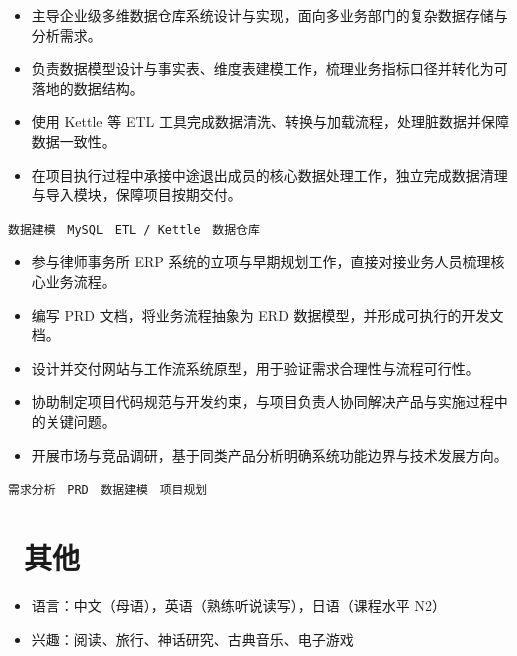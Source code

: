 \documentclass{resume}
\begin{document}

\begin{itemize}
  \item 主导企业级多维数据仓库系统设计与实现，面向多业务部门的复杂数据存储与分析需求。
  \item 负责数据模型设计与事实表、维度表建模工作，梳理业务指标口径并转化为可落地的数据结构。
  \item 使用 Kettle 等 ETL 工具完成数据清洗、转换与加载流程，处理脏数据并保障数据一致性。
  \item 在项目执行过程中承接中途退出成员的核心数据处理工作，独立完成数据清理与导入模块，保障项目按期交付。
\end{itemize}

\vspace{0.3em}
\texttt{数据建模} \textperiodcentered\
\texttt{MySQL} \textperiodcentered\
\texttt{ETL / Kettle} \textperiodcentered\
\texttt{数据仓库}



\begin{itemize}
  \item 参与律师事务所 ERP 系统的立项与早期规划工作，直接对接业务人员梳理核心业务流程。
  \item 编写 PRD 文档，将业务流程抽象为 ERD 数据模型，并形成可执行的开发文档。
  \item 设计并交付网站与工作流系统原型，用于验证需求合理性与流程可行性。
  \item 协助制定项目代码规范与开发约束，与项目负责人协同解决产品与实施过程中的关键问题。
  \item 开展市场与竞品调研，基于同类产品分析明确系统功能边界与技术发展方向。
\end{itemize}

\vspace{0.3em}
\texttt{需求分析} \textperiodcentered\
\texttt{PRD} \textperiodcentered\
\texttt{数据建模} \textperiodcentered\
\texttt{项目规划}




\section{\faInfo\ 其他}

\begin{itemize}[parsep=0.5ex]
  \item 语言：中文（母语），英语（熟练听说读写），日语（课程水平 N2）
  \item 兴趣：阅读、旅行、神话研究、古典音乐、电子游戏
\end{itemize}
\end{document}
